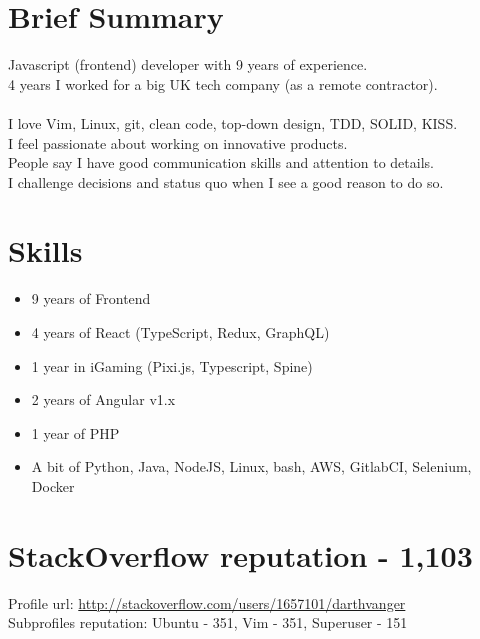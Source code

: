\documentclass[a4paper, 14pt]{article}
\begin{document}
\begin{center}
	\textsc{\Huge{}}
\end{center}


\section{Brief Summary}
  Javascript (frontend) developer with 9 years of experience.  \\
  4 years I worked for a big UK tech company (as a remote contractor). \\
  \\
  I love Vim, Linux, git, clean code, top-down design, TDD, SOLID, KISS. \\
  I feel passionate about working on innovative products. \\
  People say I have good communication skills and attention to details. \\
  I challenge decisions and status quo when I see a good reason to do so.

\section{Skills}
  \begin{itemize}
    \item 9 years of Frontend  \\
    \item 4 years of React (TypeScript, Redux, GraphQL) \\
    \item 1 year in iGaming (Pixi.js, Typescript, Spine) \\
    \item 2 years of Angular v1.x \\ 
    \item 1 year of PHP \\
    \item A bit of Python, Java, NodeJS, Linux, bash, AWS, GitlabCI, Selenium, Docker
  \end{itemize}

\section{StackOverflow reputation - 1,103}
  Profile url: \url{http://stackoverflow.com/users/1657101/darthvanger} \\
  Subprofiles reputation: Ubuntu - 351, Vim - 351, Superuser - 151
\end{document}
